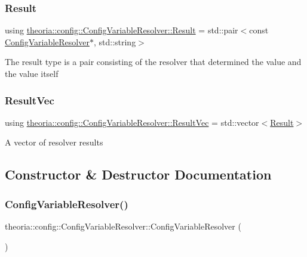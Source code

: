 \subsubsection{\texorpdfstring{Result}{Result}}
{\footnotesize\ttfamily using \hyperlink{classtheoria_1_1config_1_1ConfigVariableResolver_af27a85262d802c9ad4ecb1179efaf447}{theoria\+::config\+::\+Config\+Variable\+Resolver\+::\+Result} =  std\+::pair$<$const \hyperlink{classtheoria_1_1config_1_1ConfigVariableResolver}{Config\+Variable\+Resolver}$\ast$, std\+::string$>$}

The result type is a pair consisting of the resolver that determined the value and the value itself \mbox{\label{classtheoria_1_1config_1_1ConfigVariableResolver_a2d92a11d55181183ce4071566437f01b}} 
\subsubsection{\texorpdfstring{Result\+Vec}{ResultVec}}
{\footnotesize\ttfamily using \hyperlink{classtheoria_1_1config_1_1ConfigVariableResolver_a2d92a11d55181183ce4071566437f01b}{theoria\+::config\+::\+Config\+Variable\+Resolver\+::\+Result\+Vec} =  std\+::vector$<$\hyperlink{classtheoria_1_1config_1_1ConfigVariableResolver_af27a85262d802c9ad4ecb1179efaf447}{Result}$>$}

A vector of resolver results 

\subsection{Constructor \& Destructor Documentation}
\mbox{\label{classtheoria_1_1config_1_1ConfigVariableResolver_a90e26596be3efc1597909fd615a6a286}} 
\subsubsection{\texorpdfstring{Config\+Variable\+Resolver()}{ConfigVariableResolver()}}
{\footnotesize\ttfamily theoria\+::config\+::\+Config\+Variable\+Resolver\+::\+Config\+Variable\+Resolver (\begin{DoxyParamCaption}{ }\end{DoxyParamCaption})\hspace{0.3cm}{\ttfamily [inline]}}

